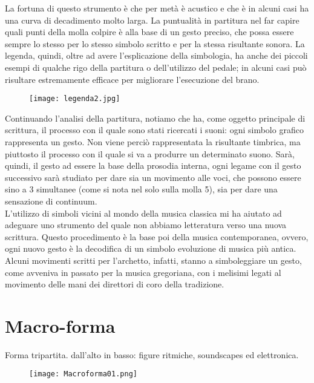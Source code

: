 La fortuna di questo strumento è che per metà è acustico e che è in alcuni casi ha una curva di decadimento molto larga. La puntualità in partitura nel far capire quali punti della molla colpire è alla base di un gesto preciso, che possa essere sempre lo stesso per lo stesso simbolo scritto e per la stessa risultante sonora. La legenda, quindi, oltre ad avere l'esplicazione della simbologia, ha anche dei piccoli esempi di qualche rigo della partitura o dell'utilizzo del pedale; in alcuni casi può risultare estremamente efficace per migliorare l'esecuzione del brano.\\
 \begin{figure}[htbp]
        \centering
        \texttt{[image: legenda2.jpg]}
\end{figure}
Continuando l'analisi della partitura, notiamo che ha, come oggetto principale di scrittura, il processo con il quale sono stati ricercati i suoni: ogni simbolo grafico rappresenta un gesto. Non viene perciò rappresentata la risultante timbrica, ma piuttosto il processo con il quale si va a produrre un determinato suono. Sarà, quindi, il gesto ad essere la base della prosodia interna, ogni legame con il gesto successivo sarà studiato per dare sia un movimento alle voci, che possono essere sino a 3 simultanee (come si nota nel solo sulla molla 5), sia per dare una sensazione di continuum. \\
L'utilizzo di simboli vicini al mondo della musica classica mi ha aiutato ad adeguare uno strumento del quale non abbiamo letteratura verso una nuova scrittura. Questo procedimento è la base poi della musica contemporanea, ovvero, ogni nuovo gesto è la decodifica di un simbolo evoluzione di musica più antica. \\
Alcuni movimenti scritti per l'archetto, infatti, stanno a simboleggiare un gesto, come avveniva in passato per la musica gregoriana, con i melisimi legati al movimento delle mani dei direttori di coro della tradizione.


\section{Macro-forma}

Forma tripartita. dall'alto in basso: figure ritmiche, soundscapes ed elettronica.


 \begin{figure}[htbp]
        \centering
        \texttt{[image: Macroforma01.png]}
\end{figure}



